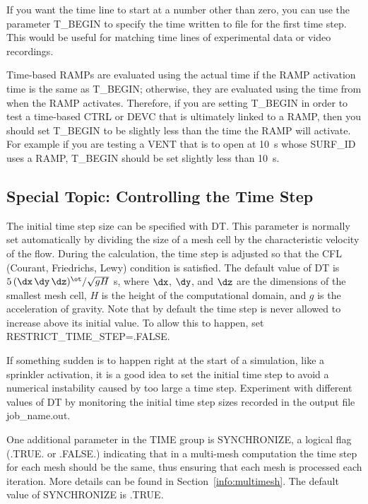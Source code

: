 \documentclass[11pt]{book}
\begin{document}
If you want the time line to start at a number other than zero, you can use the parameter
{\ct T\_BEGIN} to specify the time written to file for the first time step.
This would be useful for matching time lines of experimental data or video recordings.

Time-based {\ct RAMP}s are evaluated using the actual time if the {\ct RAMP} activation time is the same as
{\ct T\_BEGIN}; otherwise, they are evaluated using the time from when the {\ct RAMP} activates.  Therefore, if you are
setting {\ct T\_BEGIN} in order to test a time-based {\ct CTRL} or {\ct DEVC} that is ultimately
linked to a {\ct RAMP}, then you should set {\ct T\_BEGIN} to be slightly less than the time the {\ct RAMP} will activate.
For example if you are testing a {\ct VENT} that is to open at 10~s whose {\ct SURF\_ID} uses a {\ct RAMP},
{\ct T\_BEGIN} should be set slightly less than 10~s.


\subsection{Special Topic: Controlling the Time Step}
\label{info:TIME_Control}

The initial time step size can be specified with
{\ct DT}. This parameter is normally set automatically by dividing the size of a mesh cell by the
characteristic velocity of the flow.
During the calculation, the time step is adjusted so that the CFL (Courant, Friedrichs, Lewy) condition is
satisfied. The default value of {\ct DT} is $5 \, (\dx \, \dy \, \dz)^\ot/\sqrt{gH}$ s, where
$\dx$, $\dy$, and $\dz$ are the dimensions of the smallest mesh
cell, $H$ is the height of the computational domain, and $g$ is the acceleration of gravity. Note that by default the
time step is never allowed to increase above its initial value. To allow this to happen, set
{\ct RESTRICT\_TIME\_STEP=.FALSE.}

If something sudden is to happen right at the start of a simulation,
like a sprinkler activation, it is a good idea to set the initial time step
to avoid a numerical instability caused by too large a time step.
Experiment with different values of {\ct DT} by monitoring the initial time step sizes
recorded in the output file {\ct job\_name.out}.

One additional parameter in the {\ct TIME} group is {\ct SYNCHRONIZE}, a
logical flag ({\ct .TRUE.} or {\ct .FALSE.}) indicating that in a
multi-mesh computation the time step for each mesh should be the same, thus
ensuring that each mesh is processed each iteration. More details can
be found in Section~\ref{info:multimesh}. The default value of {\ct SYNCHRONIZE} is {\ct .TRUE.}
\end{document}
